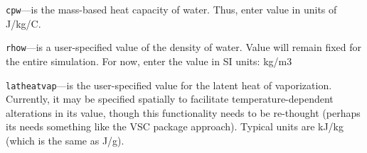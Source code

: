 \begin{description}
\item \texttt{cpw}---is the mass-based heat capacity of water. Thus, enter value in units of J/kg/C.

\item \texttt{rhow}---is a user-specified value of the density of water. Value will remain fixed for the entire simulation.  For now, enter the value in SI units: kg/m3

\item \texttt{latheatvap}---is the user-specified value for the latent heat of vaporization.  Currently, it may be specified spatially to facilitate temperature-dependent alterations in its value, though this functionality needs to be re-thought (perhaps its needs something like the VSC package approach).  Typical units are kJ/kg (which is the same as J/g).

\end{description}


